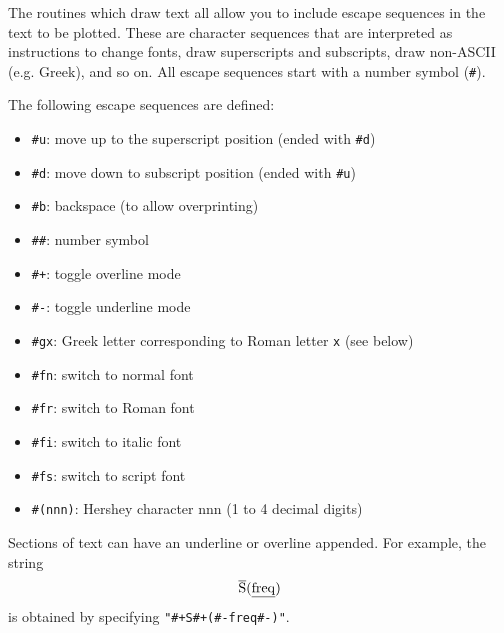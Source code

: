 The routines which draw text all allow you to include escape sequences in
the text to be plotted. These are character sequences that are interpreted
as instructions to change fonts, draw superscripts and subscripts, draw
non-ASCII (e.g. Greek), and so on. All escape sequences start with a number
symbol (\verb+#+). 

The following escape sequences are defined:
\begin{itemize}
   \item \verb+#u+: move up to the superscript position
    (ended with \verb+#d+)
   \item \verb+#d+: move down to subscript position
    (ended with \verb+#u+)
   \item \verb+#b+: backspace (to allow overprinting)
   \item \verb+##+: number symbol
   \item \verb.#+.: toggle overline mode
   \item \verb.#-.: toggle underline mode
   \item \verb+#gx+: Greek letter corresponding to Roman letter {\tt x}
                     (see below)
   \item \verb+#fn+: switch to normal font
   \item \verb+#fr+: switch to Roman font
   \item \verb+#fi+: switch to italic font
   \item \verb+#fs+: switch to script font
   \item \verb+#(nnn)+: Hershey character nnn (1 to 4 decimal digits)
\end{itemize}

Sections of text can have an underline or overline appended. For example, 
the string
\[
{\rm\overline{S}(\underline{freq})}
\]
is obtained by specifying \verb."#+S#+(#-freq#-)"..

